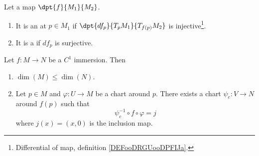 \begin{definition}      \label{DEFooZKUIooXWVGvh}
	Let a map $\dpt{f}{M_1}{M_2}$.
	\begin{enumerate}
		\item
		      It is an  at $p\in M_1$ if $\dpt{df_p}{T_pM_1}{T_{f(p)}M_2}$ is injective\footnote{Differential of map, definition \ref{DEFooDRGUooDPFIJa}.}.
		\item
		      It is a  if $df_p$ is surjective.
	\end{enumerate}
\end{definition}

\begin{theorem}	\label{THOooERBHooVDgCge}
	Let \(f \colon M\to N  \) be a \( C^1\) immersion. Then
	\begin{enumerate}
		\item
		      \( \dim(M)\leq\dim(N)\).
		\item
		      Let \( p\in M\) and \(\varphi \colon U\to M  \) be a chart around \( p\). There exists a chart \(\psi_c \colon V\to N  \) around \( f(p)\) such that
		      \begin{equation}
			      \psi_c^{-1}\circ f\circ\varphi=j
		      \end{equation}
		      where \( j(x)=(x,0)\) is the inclusion map.
	\end{enumerate}
\end{theorem}

